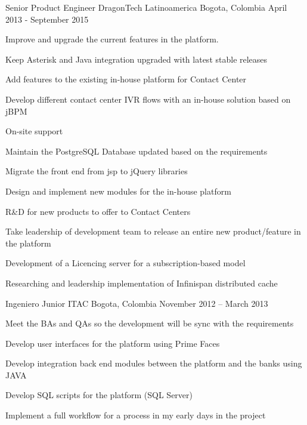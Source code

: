 \begin{cventries}
  \cventry
    {Senior Product Engineer} %
    {DragonTech Latinoamerica} %
    {Bogota, Colombia} %
    {April 2013 - September 2015} %
    {
      \begin{cvitems} %
        \item {Improve and upgrade the current features in the platform.}
        \item {Keep Asterisk and Java integration upgraded with latest stable releases}
        \item {Add features to the existing in-house platform for Contact Center}
        \item {Develop different contact center IVR flows with an in-house solution based on jBPM}
        \item {On-site support}
        \item {Maintain the PostgreSQL Database updated based on the requirements}
        \item {Migrate the front end from jsp to jQuery libraries}
        \item {Design and implement new modules for the in-house platform}
        \item {R\&D for new products to offer to Contact Centers}
        \item {Take leadership of development team to release an entire new product/feature in the platform}
        \item {Development of a Licencing server for a subscription-based model}
        \item {Researching and leadership implementation of Infinispan distributed cache}
      \end{cvitems}
    }

  \cventry
    {Ingeniero Junior} %
    {ITAC} %
    {Bogota, Colombia} %
    {November 2012 – March 2013} %
    {
      \begin{cvitems} %
        \item {Meet the BAs and QAs so the development will be sync with the requirements}
        \item {Develop user interfaces for the platform using Prime Faces}
        \item {Develop integration back end modules between the platform and the banks using JAVA}
        \item {Develop SQL scripts for the platform (SQL Server)}
        \item {Implement a full workflow for a process in my early days in the project}
      \end{cvitems}
    }


\end{cventries}
